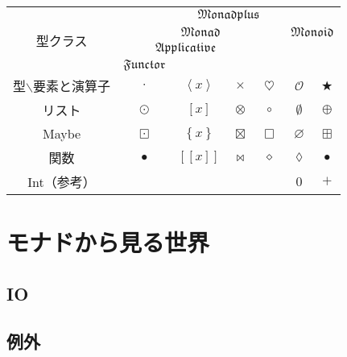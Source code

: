 \documentclass[twocolumn]{jsbook}
\def\[{[\![}
\def\]{]\!]}
\newcommand{\typeclassname}[1]{\mathfrak{#1}}
\newcommand{\typeclassapplicative}{\typeclassname{Applicative}}
\newcommand{\typeclassfunctor}{\typeclassname{Functor}}
\newcommand{\typeclassmonad}{\typeclassname{Monad}}
\newcommand{\typeclassmonadplus}{\typeclassname{Monadplus}}
\newcommand{\typeclassmonoid}{\typeclassname{Monoid}}
\newcommand{\anonymousparameter}{\lozenge}
\newcommand{\constantempty}{\emptyset}
\newcommand{\constantnothing}{\varnothing}
\newcommand{\binaryadd}{+}
\newcommand{\binarycompose}{\bullet}
\newcommand{\binaryfunctormap}{\cdot}
\newcommand{\binaryapplicativemap}{\times}
\newcommand{\binarymonadmap}{\heartsuit}%
\newcommand{\binarylistfunctormap}{\odot}
\newcommand{\binarylistapplicativemap}{\otimes}
\newcommand{\binarylistmonadmap}{\circ}%
\newcommand{\binarylistappend}{\oplus}
\newcommand{\binarymaybefunctormap}{\boxdot}
\newcommand{\binarymaybeapplicativemap}{\boxtimes}
\newcommand{\binarymaybemonadmap}{\Box}%
\newcommand{\binarymaybeappend}{\boxplus}
\newcommand{\binaryfunctionfunctormap}{\binarycompose}
\newcommand{\binaryfunctionapplicativemap}{\Join}%
\newcommand{\binaryfunctionmonadmap}{\diamond}%
\newcommand{\applicativetype}[1]{\left\langle#1\right\rangle}
\newcommand{\listtype}[1]{\left[#1\right]}
\newcommand{\maybetype}[1]{\left\{#1\right\}}
\newcommand{\functyontype}[1]{\[#1\]}
\newcommand{\mathbinaryop}{\bigstar}
\newcommand{\mathidentity}{\mathcal{O}}
\begin{document}
\begin{table*}
\begin{center}
\begin{tabular}{||c||c|c|c|c|c|c||}
\hline
\multirow{4}{*}{型クラス}
    &\multicolumn{6}{|c||}{$\typeclassmonadplus$}\\
\cline{2-7}
\multirow{3}{*}{}
    &\multicolumn{4}{|c|}{$\typeclassmonad$}
    &\multicolumn{2}{|c||}{$\typeclassmonoid$}\\
\cline{2-4}
\multirow{2}{*}{}
    &\multicolumn{3}{|c|}{$\typeclassapplicative$}
    &
    &\multicolumn{2}{|c||}{ }\\
\cline{2-2}
{ }
    &\multicolumn{1}{|c|}{$\typeclassfunctor$}
    &\multicolumn{2}{|c|}{ }
    &
    &\multicolumn{2}{|c||}{ }\\
\hline\hline
型$\backslash$要素と演算子
    &$\binaryfunctormap$
    &$\applicativetype{x}$
    &$\binaryapplicativemap$
    &$\binarymonadmap$
    &$\mathidentity$
    &$\mathbinaryop$\\
\hline
リスト
    &$\binarylistfunctormap$
    &$\listtype{x}$
    &$\binarylistapplicativemap$
    &$\binarylistmonadmap$
    &$\constantempty$
    &$\binarylistappend$\\
\hline
Maybe
    &$\binarymaybefunctormap$
    &$\maybetype{x}$
    &$\binarymaybeapplicativemap$
    &$\binarymaybemonadmap$
    &$\constantnothing$
    &$\binarymaybeappend$\\
\hline
関数
    &$\binaryfunctionfunctormap$
    &$\functyontype{x}$
    &$\binaryfunctionapplicativemap$
    &$\binaryfunctionmonadmap$
    &$\anonymousparameter$
    &$\binarycompose$\\
\hline
Int（参考）
    &
    &
    &
    &
    &$0$
    &$\binaryadd$\\
\hline
\end{tabular}
\end{center}
\end{table*}

\part{モナドから見る世界}

\chapter{IO}

\chapter{例外}
\end{document}
